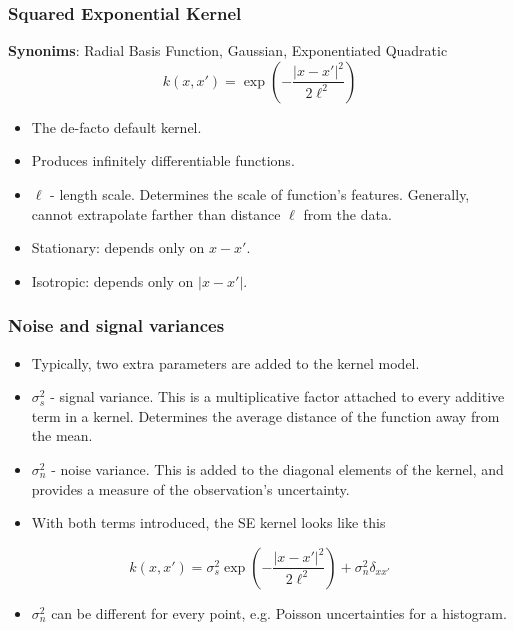 \begin{frame} \frametitle{Squared Exponential Kernel}
\textbf{Synonims}: Radial Basis Function, Gaussian, Exponentiated Quadratic
\begin{equation}
  k(x,x') = \exp\left(-\frac{\left|x-x'\right|^2}{2\ell^2}\right)
\end{equation}
  \vspace{-3mm}
\begin{itemize}
  \item The de-facto default kernel.
  \item Produces infinitely differentiable functions.
  \item $\ell$ - length scale. Determines the scale of function's features.
    Generally, cannot extrapolate farther than distance $\ell$ from the data.
  \item Stationary: depends only on $x-x'$.
  \item Isotropic: depends only on $|x-x'|$.
\end{itemize}
\vspace{-2mm}
\begin{center}
\end{center}
\end{frame}

\begin{frame} \frametitle{Noise and signal variances}
\vspace{-2mm}
\begin{itemize}
  \item Typically, two extra parameters are added to the kernel model.
  \item $\sigma_s^2$ - signal variance.
    This is a multiplicative factor attached to every additive term in a
    kernel.
    Determines the average distance of the function away from the mean.
  \item $\sigma_n^2$ - noise variance.
    This is added to the diagonal elements of the kernel, and provides a
    measure of the observation's uncertainty.
  \item With both terms introduced, the SE kernel looks like this
\end{itemize}
\begin{equation}
  k(x,x') = \sigma_s^2 \exp\left(-\frac{\left|x-x'\right|^2}{2\ell^2}\right)
          + \sigma_n^2 \delta_{xx'}
\end{equation}
\vspace{-2.5mm}
\begin{itemize}
  \item $\sigma_n^2$ can be different for every point, e.g. Poisson
    uncertainties for a histogram.
\end{itemize}
\vspace{-4mm}
\begin{changemargin}{-4.3mm}{0mm}
\end{changemargin}
\end{frame}

